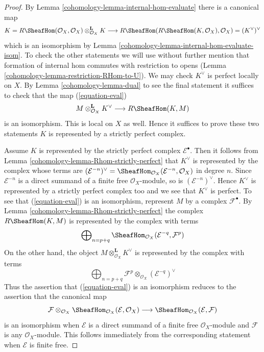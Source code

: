 \begin{proof}

By Lemma \ref{cohomology-lemma-internal-hom-evaluate} there is a canonical map
$$
K = R\SheafHom(\mathcal{O}_X, \mathcal{O}_X)
\otimes_{\mathcal{O}_X}^\mathbf{L} K \longrightarrow
R\SheafHom(R\SheafHom(K, \mathcal{O}_X), \mathcal{O}_X) =
(K^\vee)^\vee
$$
which is an isomorphism by Lemma \ref{cohomology-lemma-internal-hom-evaluate-isom}.
To check the other statements we will use without further mention that
formation of internal hom commutes with restriction to opens
(Lemma \ref{cohomology-lemma-restriction-RHom-to-U}).
We may check $K^\vee$ is perfect locally on $X$.
By Lemma \ref{cohomology-lemma-dual}
to see the final statement it suffices to check that the map
(\ref{equation-eval})
$$
M \otimes^\mathbf{L}_{\mathcal{O}_X} K^\vee
\longrightarrow
R\SheafHom(K, M)
$$
is an isomorphism. This is local on $X$ as well.
Hence it suffices to prove these two statements $K$ is represented
by a strictly perfect complex.

\medskip\noindent
Assume $K$ is represented by the strictly perfect complex
$\mathcal{E}^\bullet$. Then it follows from
Lemma \ref{cohomology-lemma-Rhom-strictly-perfect}
that $K^\vee$ is represented by the complex whose terms are
$(\mathcal{E}^{-n})^\vee =
\SheafHom_{\mathcal{O}_X}(\mathcal{E}^{-n}, \mathcal{O}_X)$
in degree $n$. Since $\mathcal{E}^{-n}$ is a direct summand of a finite
free $\mathcal{O}_X$-module, so is $(\mathcal{E}^{-n})^\vee$.
Hence $K^\vee$ is represented by a strictly perfect complex too
and we see that $K^\vee$ is perfect.
To see that (\ref{equation-eval}) is an isomorphism, represent
$M$ by a complex $\mathcal{F}^\bullet$.
By Lemma \ref{cohomology-lemma-Rhom-strictly-perfect} the complex
$R\SheafHom(K, M)$ is represented by the complex with terms
$$
\bigoplus\nolimits_{n = p + q}
\SheafHom_{\mathcal{O}_X}(\mathcal{E}^{-q}, \mathcal{F}^p)
$$
On the other hand, the object $M \otimes^\mathbf{L}_{\mathcal{O}_X} K^\vee$
is represented by the complex with terms
$$
\bigoplus\nolimits_{n = p + q}
\mathcal{F}^p \otimes_{\mathcal{O}_X} (\mathcal{E}^{-q})^\vee
$$
Thus the assertion that (\ref{equation-eval}) is an isomorphism
reduces to the assertion that the canonical map
$$
\mathcal{F}
\otimes_{\mathcal{O}_X}
\SheafHom_{\mathcal{O}_X}(\mathcal{E}, \mathcal{O}_X)
\longrightarrow
\SheafHom_{\mathcal{O}_X}(\mathcal{E}, \mathcal{F})
$$
is an isomorphism when $\mathcal{E}$ is a direct summand of a finite
free $\mathcal{O}_X$-module and $\mathcal{F}$ is any $\mathcal{O}_X$-module.
This follows immediately from the corresponding statement when
$\mathcal{E}$ is finite free.
\end{proof}

